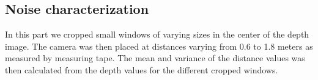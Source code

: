 \documentclass[DIV12,a4paper]{scrartcl}
\begin{document}
\subsection{Noise characterization}
\label{sec:noise_characterization}
In this part we cropped small windows of varying sizes in the center of the depth image. The camera was then placed at distances varying from 0.6 to 1.8 meters as measured by measuring tape. The mean and variance of the distance values was then calculated from the depth values for the different cropped windows.
\end{document}
